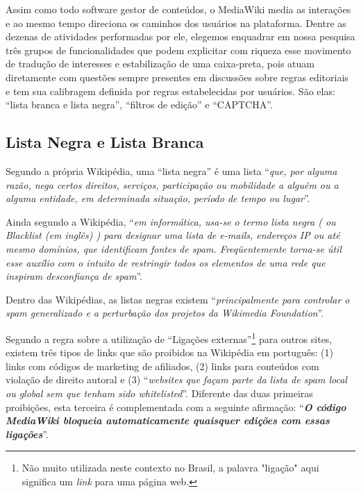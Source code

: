 Assim como todo software gestor de conteúdos, o MediaWiki media as interações e ao mesmo tempo direciona os caminhos dos usuários na plataforma. Dentre as dezenas de atividades performadas por ele, elegemos enquadrar em nossa pesquisa três grupos de funcionalidades que podem explicitar com riqueza esse movimento de tradução de interesses e estabilização de uma caixa-preta, pois atuam diretamente com questões sempre presentes em discussões sobre regras editoriais e tem sua calibragem definida por regras estabelecidas por usuários. São elas: ``lista branca e lista negra'', ``filtros de edição'' e ``CAPTCHA''.

\subsection{Lista Negra e Lista Branca}

Segundo a própria Wikipédia, uma ``lista negra'' é uma lista ``\textit{que, por alguma razão, nega certos direitos, serviços, participação ou mobilidade a alguém ou a alguma entidade, em determinada situação, período de tempo ou lugar}''. 

Ainda segundo a Wikipédia, ``\textit{em informática, usa-se o termo lista negra ( ou Blacklist (em inglês) ) para designar uma lista de e-mails, endereços IP ou até mesmo domínios, que identificam fontes de spam. \textit{Freqüentemente} torna-se útil esse auxílio com o intuito de restringir todos os elementos de uma rede que inspiram desconfiança de spam}''.

Dentro das Wikipédias, as listas negras existem ``\textit{principalmente para controlar o spam generalizado e a perturbação dos projetos da Wikimedia Foundation}''. 

Segundo a regra sobre a utilização de ``Ligações externas''\footnote{Não muito utilizada neste contexto no Brasil, a palavra "ligação" aqui significa um \textit{link} para uma página web.} para outros sites, existem três tipos de links que são proibidos na Wikipédia em português: (1) links com códigos de marketing de afiliados, (2) links para conteúdos com violação de direito autoral e (3) ``\textit{websites que façam parte da lista de spam local ou global sem que tenham sido whitelisted}''. Diferente das duas primeiras proibições, esta terceira é complementada com a seguinte afirmação: ``\textbf{\textit{O código MediaWiki bloqueia automaticamente quaisquer edições com essas ligações}}''. 

